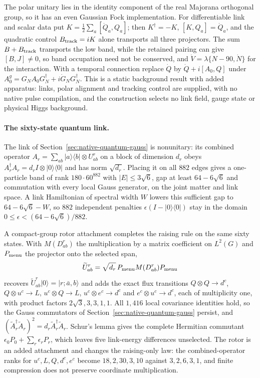 \documentclass[11pt]{article}
\begin{document}
The polar unitary lies in the identity component of the real Majorana orthogonal group, so
it has an even Gaussian Fock implementation. For differentiable link and scalar data put
\(K=\frac12\sum_a[\dot Q_a,Q_a]\); then \(K^\dagger=-K\), \([K,Q_a]=\dot Q_a\), and the quadratic
control \(B_{\rm track}=iK\) alone transports all three projectors. The sum
\(B+B_{\rm track}\) transports the low band, while the retained pairing can give \([B,J]\ne0\),
so band occupation need not be conserved, and \(\dot V=\lambda\{N-90,\dot N\}\) for the
interaction. With a temporal connection replace \(\dot Q\) by \(\dot Q+i[A_0,Q]\) under
\(A_0^g=G_NA_0G_N^\dagger+i\dot G_NG_N^\dagger\). This is a static background result with added
apparatus: links, polar alignment and tracking control are supplied, with no native pulse
compilation, and the construction selects no link field, gauge state or physical Higgs
background.

\paragraph{The sixty-state quantum link.}
The link of Section~\ref{sec:native-quantum-gauss} is nonunitary: its combined operator
\(A_r=\sum_{ab}|a\rangle\langle b|\otimes U^r_{ab}\) on a block of dimension \(d_r\) obeys
\(A_r^\dagger A_r=d_rI\otimes|0\rangle\langle0|\) and has norm \(\sqrt{d_r}\). Placing it on all
\(882\) edges gives a one-particle band of rank \(180\cdot60^{882}\) with \(|E|\le3\sqrt6\), gap at
least \(64-6\sqrt6\) and commutation with every local Gauss generator, on the joint matter
and link space. A link Hamiltonian of spectral width \(W\) lowers this sufficient gap to
\(64-6\sqrt6-W\), so \(882\) independent penalties \(\epsilon(I-|0\rangle\langle0|)\) stay in the
domain \(0\le\epsilon<(64-6\sqrt6)/882\).

A compact-group rotor attachment completes the raising rule on the same sixty states. With
\(M(D^r_{ab})\) the multiplication by a matrix coefficient on \(L^2(G)\) and \(P_{\rm menu}\) the
projector onto the selected span,
\[
 \widetilde U^r_{ab}=\sqrt{d_r}\,P_{\rm menu}M(D^r_{ab})P_{\rm menu}
\]
recovers \(\widetilde U^r_{ab}|0\rangle=|r;\bar a,b\rangle\) and adds the exact flux transitions
\(Q\otimes Q\to d^c\), \(Q\otimes u^c\to L\), \(u^c\otimes Q\to L\), \(u^c\otimes e^c\to d^c\) and
\(e^c\otimes u^c\to d^c\), each of multiplicity one, with product factors
\(2\sqrt3,3,3,1,1\). All \(1{,}416\) local covariance identities hold, so the Gauss commutators
of Section~\ref{sec:native-quantum-gauss} persist, and
\((\widetilde A_r^\dagger\widetilde A_r)^2=d_r\widetilde A_r^\dagger\widetilde A_r\). Schur's lemma gives the
complete Hermitian commutant \(\epsilon_0P_0+\sum_r\epsilon_rP_r\), which leaves five link-energy
differences unselected. The rotor is an added attachment and changes the raising-only law:
the combined-operator ranks for \(u^c,L,Q,d^c,e^c\) become \(18,2,30,3,10\) against \(3,2,6,3,1\),
and finite compression does not preserve coordinate multiplication.
\end{document}
